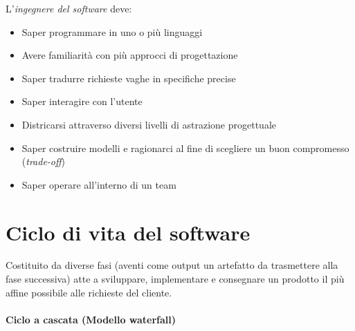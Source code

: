 \newpage

L'\textit{ingegnere del software} deve:
\begin{itemize}
    \item Saper programmare in uno o più linguaggi
    \item Avere familiarità con più approcci di progettazione
    \item Saper tradurre richieste vaghe in specifiche precise
    \item Saper interagire con l'utente
    \item Districarsi attraverso diversi livelli di astrazione progettuale
    \item Saper costruire modelli e ragionarci al fine di scegliere un buon compromesso (\textit{trade-off})
    \item Saper operare all'interno di un team
\end{itemize}

\section{Ciclo di vita del software}
Costituito da diverse fasi (aventi come output un artefatto da trasmettere alla fase successiva) atte a sviluppare, implementare e consegnare un prodotto il più affine possibile alle richieste del cliente.

\paragraph{Ciclo a cascata (Modello waterfall)}

